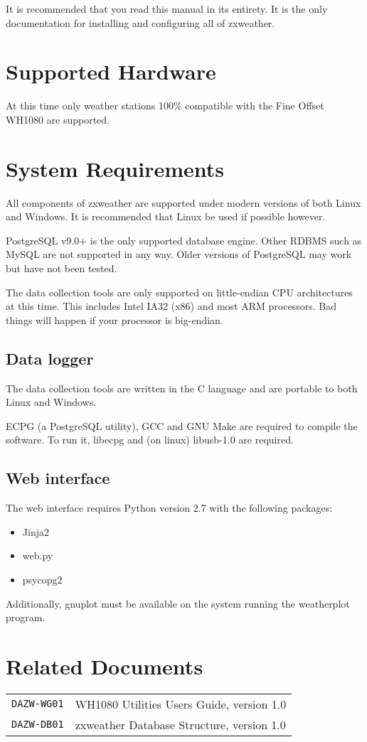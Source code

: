\documentclass[a4paper,10pt,draft]{book}
\begin{document}
It is recommended that you read this manual in its entirety. It is the only documentation for installing and configuring all of zxweather.

\section{Supported Hardware}
At this time only weather stations 100\% compatible with the Fine Offset WH1080 are supported.

\section{System Requirements}
All components of zxweather are supported under modern versions of both Linux and Windows. It is recommended that Linux be used if possible however.

PostgreSQL v9.0+ is the only supported database engine. Other RDBMS such as MySQL are not supported in any way. Older versions of PostgreSQL may work but have not been tested.

The data collection tools are only supported on little-endian CPU architectures at this time. This includes Intel IA32 (x86) and most ARM processors. Bad things will happen if your processor is big-endian.

\subsection{Data logger}
The data collection tools are written in the C language and are portable to both Linux and Windows.

ECPG (a PostgreSQL utility), GCC and GNU Make are required to compile the software. To run it, libecpg and (on linux) libusb-1.0 are required.

\subsection{Web interface}
The web interface requires Python version 2.7 with the following packages:
\begin{itemize}
\item Jinja2
\item web.py
\item psycopg2
\end{itemize}

Additionally, gnuplot must be available on the system running the weatherplot program.

\section{Related Documents}
\begin{tabular}{l l}
\verb|DAZW-WG01| & WH1080 Utilities Users Guide, version 1.0 \\
\verb|DAZW-DB01| & zxweather Database Structure, version 1.0 \\
\end{tabular}
\end{document}
